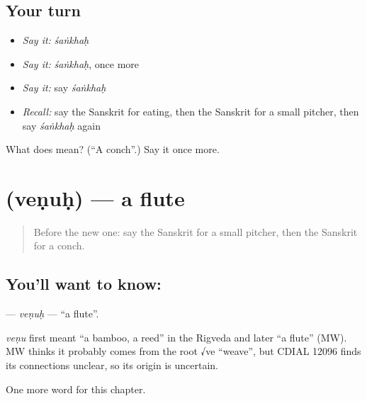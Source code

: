 \subsection*{Your turn}
\begin{itemize}
\raggedright
  \item \emph{Say it:} \emph{śaṅkhaḥ}
  \item \emph{Say it:} \emph{śaṅkhaḥ}, once more
  \item \emph{Say it:} say \emph{śaṅkhaḥ}
  \item \emph{Recall:} say the Sanskrit for eating, then the Sanskrit for a small pitcher, then say \emph{śaṅkhaḥ} again
\end{itemize}

\begin{tcolorbox}[breakable,colback=teal!4,colframe=teal!35!black,title={Before you move on}]
What does  mean? (\textquotedblleft{}A conch\textquotedblright{}.) Say it once more.
\end{tcolorbox}
\section[\texorpdfstring{\sk{वेणुः} (veṇuḥ)}{वेणुः (veṇuḥ)}]{ (veṇuḥ) — a flute}

\label{lesson:SA-C161-venuh}



\begin{quote}
Before the new one: say the Sanskrit for a small pitcher, then the Sanskrit for a conch.
\end{quote}

\subsection*{You'll want to know: }
\textbf{} — \emph{veṇuḥ} — \textquotedblleft{}a flute\textquotedblright{}.

\begin{cousinweb}
\emph{veṇu} first meant \textquotedblleft{}a bamboo, a reed\textquotedblright{} in the Rigveda and later \textquotedblleft{}a flute\textquotedblright{} (MW). MW thinks it probably comes from the root √ve \textquotedblleft{}weave\textquotedblright{}, but CDIAL 12096 finds its connections unclear, so its origin is uncertain.
\end{cousinweb}

\begin{grammarlens}[title={What you've built}]
One more word for this chapter.
\end{grammarlens}

